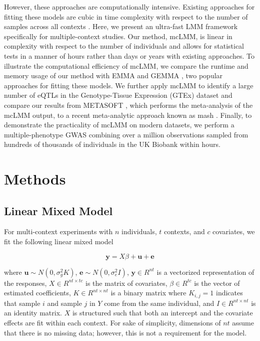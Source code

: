     However, these approaches are computationally intensive. Existing approaches for fitting these models are cubic in time complexity with respect to the number of samples across all contexts \cite{Kang, Zhou}. Here, we present an ultra-fast LMM framework specifically for multiple-context studies. Our method, mcLMM, is linear in complexity with respect to the number of individuals and allows for statistical tests in a manner of hours rather than days or years with existing approaches. To illustrate the computational efficiency of mcLMM, we compare the runtime and memory usage of our method with EMMA and GEMMA \cite{Kang, Zhou}, two popular approaches for fitting these models. We further apply mcLMM to identify a large number of eQTLs in the Genotype-Tissue Expression (GTEx) dataset \cite{GTEx_Consortium2020-xx} and compare our results from METASOFT \cite{Metasoft}, which performs the meta-analysis of the mcLMM output, to a recent meta-analytic approach known as mash \cite{Urbut2019}. Finally, to demonstrate the practicality of mcLMM on modern datasets, we perform a multiple-phenotype GWAS combining over a million observations sampled from hundreds of thousands of individuals in the UK Biobank \cite{Bycroft2018} within hours.

\section{Methods}

   \subsection{Linear Mixed Model}
        For multi-context experiments with $n$ individuals, $t$ contexts, and $c$ covariates, we fit the following linear mixed model
        
        \begin{equation}
            \mathbf{y} = X\beta + \mathbf{u} + \mathbf{e}
        \end{equation}
        
        \noindent where $\mathbf{u} \sim N(0,\sigma_g^2 K)$, $\mathbf{e} \sim N(0,\sigma_e^2 I)$,  $\mathbf{y} \in R^{nt}$ is a vectorized representation of the responses, $X \in R^{nt \times tc}$ is the matrix of covariates,
        $\beta \in R^{tc}$ is the vector of estimated coefficients, $K \in R^{nt \times nt}$ is a binary matrix where $K_{i,j} = 1$ 
        indicates that sample $i$ and sample $j$ in $Y$ come from the same individual, and $I \in R^{nt \times nt}$ is an identity matrix.
        $X$ is structured such that both an intercept and the covariate effects are fit within each context. For sake of simplicity, dimensions
        of $nt$ assume that there is no missing data; however, this is not a requirement for the model.
        
